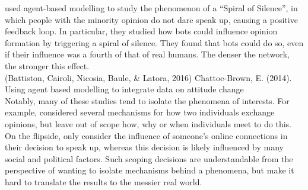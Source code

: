 \cite{Ross2019} used agent-based modelling to study the phenomenon of a “Spiral of Silence”, in which people with the minority opinion do not dare speak up, causing a positive feedback loop. In particular, they studied how bots could influence opinion formation by triggering a spiral of silence. They found that bots could do so, even if their influence was a fourth of that of real humans. The denser the network, the stronger this effect. \\

(Battiston, Cairoli, Nicosia, Baule, \& Latora, 2016)
Chattoe-Brown, E. (2014). Using agent based modelling to integrate data on attitude change \\

Notably, many of these studies tend to isolate the phenomena of interests. For example, \cite{Deffuant2002} considered several mechanisms for how two individuals exchange opinions, but leave out of scope how, why or when individuals meet to do this. On the flipside, \cite{Ross2019} only consider the influence of someone’s online connections in their decision to speak up, whereas this decision is likely influenced by many social and political factors. Such scoping decisions are understandable from the perspective of wanting to isolate mechanisms behind a phenomena, but make it hard to translate the results to the messier real world.
 

